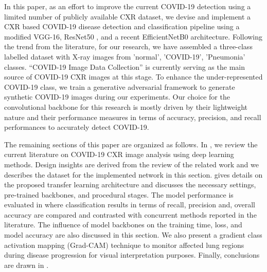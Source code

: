  
 In this paper, as an effort to improve the current COVID-19 detection using a limited number of publicly available CXR dataset,  we devise and implement a CXR based COVID-19 disease detection and classification pipeline using a modified VGG-16, ResNet50 \cite{he2016deep}, and a recent EfficientNetB0 \cite{tan2019efficientnet} architecture. Following the trend from the literature, for our research, we have assembled a three-class labelled dataset with X-ray images from 'normal', 'COVID-19', 'Pneumonia' classes. “COVID-19 Image Data Collection” \cite{cohen2020covid} is currently serving as the main source of COVID-19 CXR images at this stage. To enhance the under-represented COVID-19 class, we train a generative adversarial framework to generate synthetic COVID-19 images during our experiments. Our choice for the convolutional backbone for this research is mostly driven by their lightweight nature and their performance measures in terms of accuracy, precision, and recall performances to accurately detect COVID-19.


The remaining sections of this paper are organized as follows. In , we review the current literature on COVID-19 CXR image analysis using deep learning methods. Design insights are derived from the review of the related work and we describes the dataset for the implemented network in this section.  gives details on the proposed transfer learning architecture and discusses the necessary settings, pre-trained backbones, and procedural stages. The model performance is evaluated in  where classification results in terms of recall, precision and, overall accuracy are compared and contrasted with concurrent methods reported in the literature. The influence of model backbones on the training time, loss, and model accuracy are also discussed in this section. We also present a gradient class activation mapping (Grad-CAM) technique to monitor affected lung regions during disease progression for visual interpretation purposes. Finally, conclusions are drawn in .


